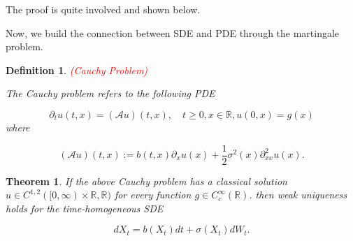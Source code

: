 \documentclass{article}
\newtheorem{definition}{Definition}
\newtheorem{theorem}{Theorem}
\begin{document}
The proof is quite involved and shown below. 

Now, we build the connection between SDE and PDE through the martingale problem.

\begin{definition} \textcolor{red}{(Cauchy Problem)}

The Cauchy problem refers to the following PDE

\begin{equation*}
\partial_tu(t,x)=(\mathcal{A}u)(t,x), \quad t\geq0, x\in\mathbb{R},u(0,x)=g(x)
\end{equation*}
where

\begin{equation*} 
(\mathcal{A}u)(t,x):=b(t,x)\partial_xu(x)+\frac{1}{2}\sigma^2(x)\partial^2_{xx}u(x).
\end{equation*}

\end{definition}

\begin{theorem}
If the above Cauchy problem has a classical solution $u\in C^{1,2}([0,\infty)\times\mathbb{R},\mathbb{R})$ for every function $g\in C_c^\infty(\mathbb{R})$. then weak uniqueness holds for the time-homogeneous SDE

\begin{equation} \label{time_homo_sde}
dX_t=b(X_t)dt + \sigma(X_t)dW_t.
\end{equation}

\end{theorem}
\end{document}
